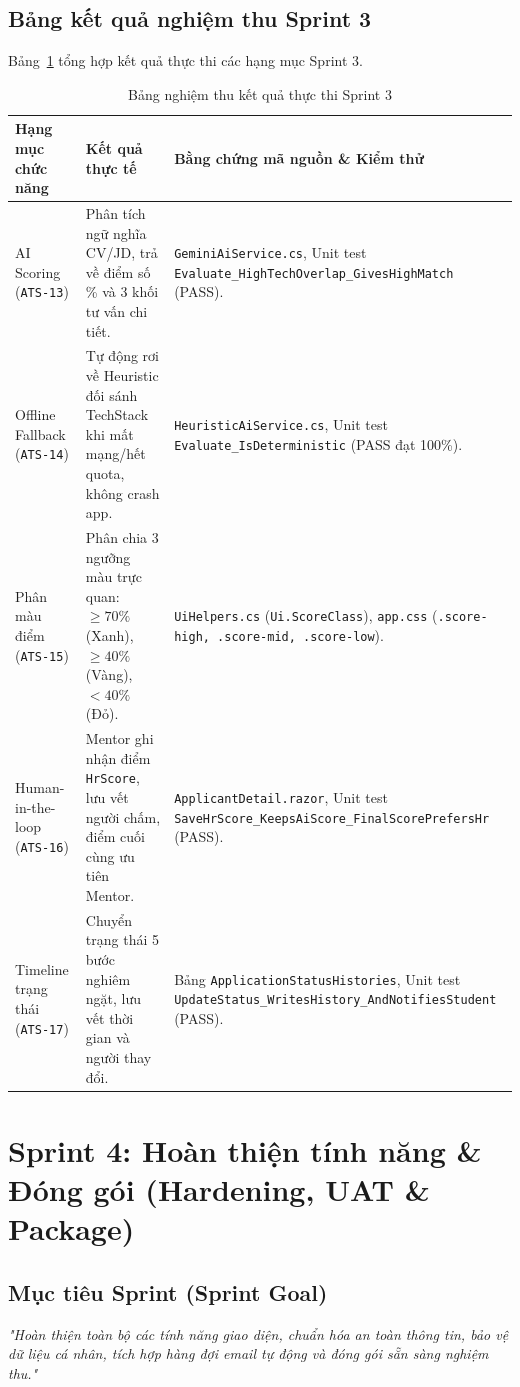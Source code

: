 \subsection{Bảng kết quả nghiệm thu Sprint 3}
Bảng~\ref{tab:sprint3-results} tổng hợp kết quả thực thi các hạng mục Sprint 3.

\begin{table}[htbp]
\centering
\small
\caption{Bảng nghiệm thu kết quả thực thi Sprint 3}
\label{tab:sprint3-results}
\begin{tabularx}{\textwidth}{p{3.2cm} p{3.8cm} X}
\toprule
\textbf{Hạng mục chức năng} & \textbf{Kết quả thực tế} & \textbf{Bằng chứng mã nguồn \& Kiểm thử} \\
\midrule
AI Scoring (\texttt{ATS-13}) & Phân tích ngữ nghĩa CV/JD, trả về điểm số \% và 3 khối tư vấn chi tiết. & \texttt{GeminiAiService.cs}, Unit test \texttt{Evaluate\_HighTechOverlap\_GivesHighMatch} (PASS). \\
\addlinespace
Offline Fallback (\texttt{ATS-14}) & Tự động rơi về Heuristic đối sánh TechStack khi mất mạng/hết quota, không crash app. & \texttt{HeuristicAiService.cs}, Unit test \texttt{Evaluate\_IsDeterministic} (PASS đạt 100\%). \\
\addlinespace
Phân màu điểm (\texttt{ATS-15}) & Phân chia 3 ngưỡng màu trực quan: $\ge 70\%$ (Xanh), $\ge 40\%$ (Vàng), $< 40\%$ (Đỏ). & \texttt{UiHelpers.cs} (\texttt{Ui.ScoreClass}), \texttt{app.css} (\texttt{.score-high, .score-mid, .score-low}). \\
\addlinespace
Human-in-the-loop (\texttt{ATS-16}) & Mentor ghi nhận điểm \texttt{HrScore}, lưu vết người chấm, điểm cuối cùng ưu tiên Mentor. & \texttt{ApplicantDetail.razor}, Unit test \texttt{SaveHrScore\_KeepsAiScore\_FinalScorePrefersHr} (PASS). \\
\addlinespace
Timeline trạng thái (\texttt{ATS-17}) & Chuyển trạng thái 5 bước nghiêm ngặt, lưu vết thời gian và người thay đổi. & Bảng \texttt{ApplicationStatusHistories}, Unit test \texttt{UpdateStatus\_WritesHistory\_AndNotifiesStudent} (PASS). \\
\bottomrule
\end{tabularx}
\end{table}

\section{Sprint 4: Hoàn thiện tính năng \& Đóng gói (Hardening, UAT \& Package)}
\label{sec:sprint-4}

\subsection{Mục tiêu Sprint (Sprint Goal)}
\textit{"Hoàn thiện toàn bộ các tính năng giao diện, chuẩn hóa an toàn thông tin, bảo vệ dữ liệu cá nhân, tích hợp hàng đợi email tự động và đóng gói sẵn sàng nghiệm thu."}

